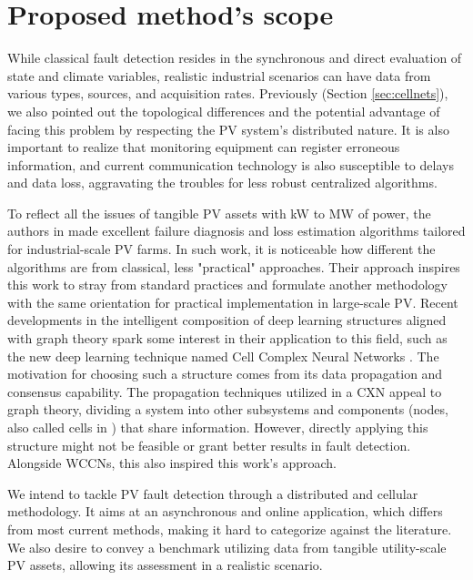\section{Proposed method's scope}


While classical fault detection resides in the synchronous and direct evaluation of state and climate variables, realistic industrial scenarios can have data from various types, sources, and acquisition rates. Previously (Section \ref{sec:cellnets}), we also pointed out the topological differences and the potential advantage of facing this problem by respecting the PV system's distributed nature.
It is also important to realize that monitoring equipment can register erroneous information, and current communication technology is also susceptible to delays and data loss, aggravating the troubles for less robust centralized algorithms.

To reflect all the issues of tangible PV assets with kW to MW of power, the authors in \cite{Livera2022} made excellent failure diagnosis and loss estimation algorithms tailored for industrial-scale PV farms. In such work, it is noticeable how different the algorithms are from classical, less "practical" approaches. Their approach inspires this work to stray from standard practices and formulate another methodology with the same orientation for practical implementation in large-scale PV.
Recent developments in the intelligent composition of deep learning structures aligned with graph theory spark some interest in their application to this field, such as the new deep learning technique named Cell Complex Neural Networks \cite{Hajij2020}. The motivation for choosing such a structure comes from its data propagation and consensus capability. The propagation techniques utilized in a CXN appeal to graph theory, dividing a system into other subsystems and components (nodes, also called cells in \cite{Hajij2020}) that share information. However, directly applying this structure might not be feasible or grant better results in fault detection. Alongside WCCNs, this also inspired this work's approach.

We intend to tackle PV fault detection through a distributed and cellular methodology. It aims at an asynchronous and online application, which differs from most current methods, making it hard to categorize against the literature. We also desire to convey a benchmark utilizing data from tangible utility-scale PV assets, allowing its assessment in a realistic scenario.
